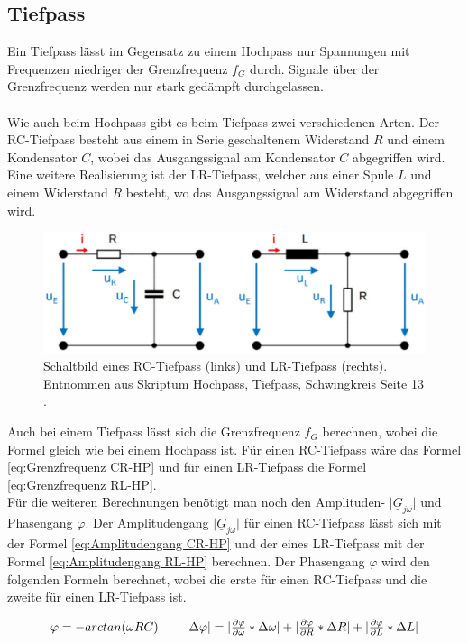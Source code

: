\documentclass[12pt,a4paper,twoside]{article}
\begin{document}
\subsection{Tiefpass}
Ein Tiefpass lässt im Gegensatz zu einem Hochpass nur Spannungen mit Frequenzen niedriger der Grenzfrequenz $f_G$ durch. 
Signale über der Grenzfrequenz werden nur stark gedämpft durchgelassen. 
\\
\\
Wie auch beim Hochpass gibt es beim Tiefpass zwei verschiedenen Arten. Der RC-Tiefpass besteht aus einem in Serie geschaltenem Widerstand $R$ und einem Kondensator $C$, wobei das Ausgangssignal am Kondensator $C$ abgegriffen wird. 
Eine weitere Realisierung ist der LR-Tiefpass, welcher aus einer Spule $L$ und einem Widerstand $R$ besteht, wo das Ausgangssignal am Widerstand abgegriffen wird. 

\begin{figure}[H]
    \centering
    \includegraphics[width=0.6\linewidth]{nudes/TP.jpg}
    \caption{Schaltbild eines RC-Tiefpass (links) und LR-Tiefpass (rechts). Entnommen aus Skriptum Hochpass, Tiefpass, Schwingkreis Seite 13 \cite{teachcenter2}. }
    \label{fig:grundTief}
\end{figure}

\noindent
Auch bei einem Tiefpass lässt sich die Grenzfrequenz $f_G$ berechnen, wobei die Formel gleich wie bei einem Hochpass ist. Für einen RC-Tiefpass wäre das Formel \ref{eq:Grenzfrequenz CR-HP} und für einen LR-Tiefpass die Formel \ref{eq:Grenzfrequenz RL-HP}. 
\\
Für die weiteren Berechnungen benötigt man noch den Amplituden- $\vert \underline{G}_{j \omega} \vert$ und Phasengang $\varphi$. 
Der Amplitudengang $\vert \underline{G}_{j \omega} \vert$ für einen RC-Tiefpass lässt sich mit der Formel \ref{eq:Amplitudengang CR-HP} und der eines LR-Tiefpass mit der Formel \ref{eq:Amplitudengang RL-HP} berechnen. 
Der Phasengang $\varphi$ wird den folgenden Formeln berechnet, wobei die erste für einen RC-Tiefpass und die zweite für einen LR-Tiefpass ist. 

\begin{equation}
    \label{eq:Phasengang RC-TP}
    \centerline{$\varphi = -arctan( \omega RC)$ \\ $\Delta \varphi \vert = \vert \frac{\partial \varphi}{\partial \omega} * \Delta \omega \vert + \vert \frac{\partial \varphi}{\partial R} * \Delta R \vert + \vert \frac{\partial \varphi}{\partial L} * \Delta L \vert$}
\end{equation}
\end{document}
